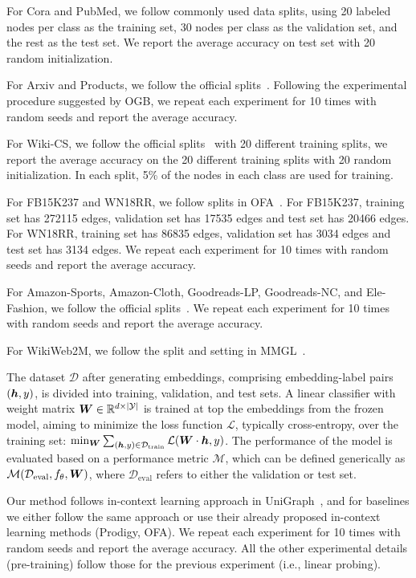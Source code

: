 For Cora and PubMed, we follow commonly used data splits, using 20 labeled nodes per class as the training set, 30 nodes per class as the validation set, and the rest as the test set. We report the average accuracy on test set with 20 random initialization.

For Arxiv and Products, we follow the official splits~\cite{hu2020open}. Following the experimental procedure suggested by OGB, we repeat each experiment for 10 times with random seeds and report the average accuracy.

For Wiki-CS, we follow the official splits~\cite{mernyei2020wiki} with 20 different training splits, we report the average accuracy on the 20 different training splits with 20 random initialization. In each split, 5\% of the nodes in each class are used for training.

For FB15K237 and WN18RR, we follow splits in OFA~\cite{liu2023one}. 
For FB15K237, training set has 272115 edges, validation set has 17535 edges and test set has 20466 edges.
For WN18RR, training set has 86835 edges, validation set has 3034 edges and test set has 3134 edges. We repeat each experiment for 10 times with random seeds and report the average accuracy.

For Amazon-Sports, Amazon-Cloth, Goodreads-LP, Goodreads-NC, and Ele-Fashion, we follow the official splits~\cite{zhu2024multimodal}. We repeat each experiment for 10 times with random seeds and report the average accuracy.

For WikiWeb2M, we follow the split and setting in MMGL~\cite{yoon2023multimodal}.



The dataset \(\mathcal{D}\) after generating embeddings, comprising embedding-label pairs \(({\bm{h}}, y)\), is divided into training, validation, and test sets. 
A linear classifier with weight matrix \( {\bm{W}} \in \mathbb{R}^{d \times |\mathcal{Y}|} \) is trained at top the embeddings from the frozen model, aiming to minimize the loss function \(\mathcal{L}\), typically cross-entropy, over the training set: \(\min_{\bm{W}} \sum_{({\bm{h}}, y) \in \mathcal{D}_{\text{train}}} \mathcal{L}({\bm{W}} \cdot {\bm{h}}, y)\). 
The performance of the model is evaluated based on a performance metric \( \mathcal{M} \), which can be defined generically as \(\mathcal{M}(\mathcal{D}_{\text{eval}}, f_{\theta}, {\bm{W}})\), where \(\mathcal{D}_{\text{eval}}\) refers to either the validation or test set. 

Our method follows in-context learning approach in UniGraph~\cite{he2024unigraphlearningunifiedcrossdomain}, and for baselines we either follow the same approach or use their already proposed in-context learning methods (Prodigy, OFA). We repeat each experiment for 10 times with random seeds and report the average accuracy.
All the other experimental details (pre-training) follow those for the previous experiment (i.e., linear probing). 


